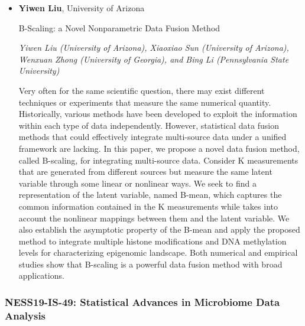\begin{itemize}
\item \textbf{Yiwen Liu}, University of Arizona

B-Scaling: a Novel Nonparametric Data Fusion Method

\emph{\footnotesize Yiwen Liu (University of Arizona), Xiaoxiao Sun (University of Arizona), Wenxuan Zhong (University of Georgia), and Bing Li (Pennsylvania State University)}

Very often for the same scientific question, there may exist different techniques or experiments that measure the same numerical quantity. Historically, various methods have been developed to exploit the information within each type of data independently. However, statistical data fusion methods that could effectively integrate multi-source data under a unified framework are lacking. In this paper, we propose a novel data fusion method, called B-scaling, for integrating multi-source data. Consider K measurements that are generated from different sources but measure the same latent variable through some linear or nonlinear ways. We seek to find a representation of the latent variable, named B-mean, which captures the common information contained in the K measurements while takes into account the nonlinear mappings between them and the latent variable. We also establish the asymptotic property of the B-mean and apply the proposed method to integrate multiple histone modifications and DNA methylation levels for characterizing epigenomic landscape. Both numerical and empirical studies show that B-scaling is a powerful data fusion method with broad applications.

\end{itemize}

\subsubsection*{NESS19-IS-49: Statistical Advances in Microbiome Data Analysis}


